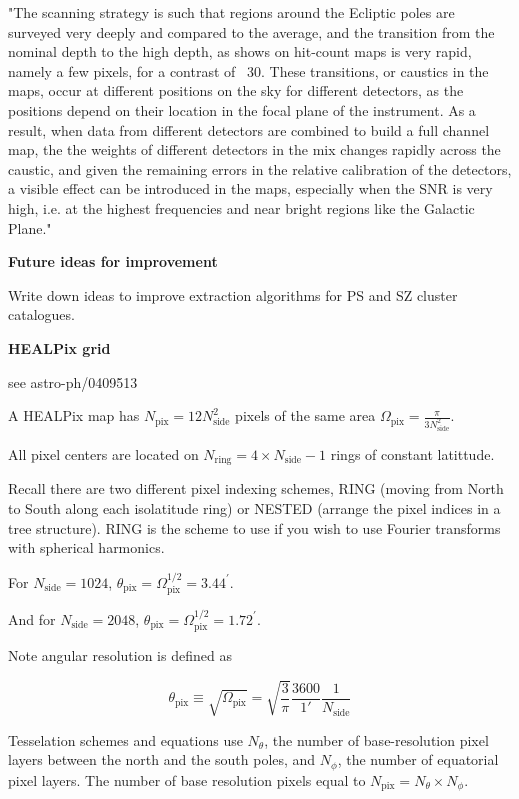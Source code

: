 \documentclass[a4paper, 11pt]{article}
\begin{document}
"The scanning strategy is such that regions around the Ecliptic poles are surveyed very deeply and compared to the average, and the transition from the nominal depth to the high depth, as shows on hit-count maps is very rapid, namely a few pixels, for a contrast of ~30. These transitions, or caustics in the maps, occur at different positions on the sky for different detectors, as the positions depend on their location in the focal plane of the instrument. As a result, when data from different detectors are combined to build a full channel map, the the weights of different detectors in the mix changes rapidly across the caustic, and given the remaining errors in the relative calibration of the detectors, a visible effect can be introduced in the maps, especially when the SNR is very high, i.e. at the highest frequencies and near bright regions like the Galactic Plane."



\textbf{Future ideas for improvement}

Write down ideas to improve extraction algorithms for PS and SZ cluster catalogues. 



\textbf{HEALPix grid}

see astro-ph/0409513


A HEALPix map has $N_{\text{pix}}=12N^2_{\text{side}}$ pixels of the same area $\Omega_{\text{pix}}=\frac{\pi}{3N^2_{\text{side}}}$. 

All pixel centers are located on $N_{\text{ring}}=4\times N_{\text{side}}-1$ rings of constant latittude. 

Recall there are two different pixel indexing schemes, RING (moving from North to South along each isolatitude ring) or NESTED (arrange the pixel indices in a tree structure). RING is the scheme to use if you wish to use Fourier transforms with spherical harmonics. 

For $N_{\text{side}}=1024$, $\theta_{\text{pix}}=\Omega_{\text{pix}}^{1/2}=3.44^{'}$. 

And for $N_{\text{side}}=2048$, $\theta_{\text{pix}}=\Omega_{\text{pix}}^{1/2}=1.72^{'}$. 

Note angular resolution is defined as 

$$
\theta_{\text{pix}}\equiv\sqrt{\Omega_{\text{pix}}}=\sqrt{\frac{3}{\pi}}\frac{3600}{1'}\frac{1}{N_{\text{side}}}
$$

Tesselation schemes and equations use $N_{\theta}$, the number of base-resolution pixel layers between the north and the south poles, and $N_{\phi}$, the number of equatorial pixel layers. The number of base resolution pixels equal to $N_{\text{pix}}=N_{\theta}\times N_{\phi}$. 
\end{document}
